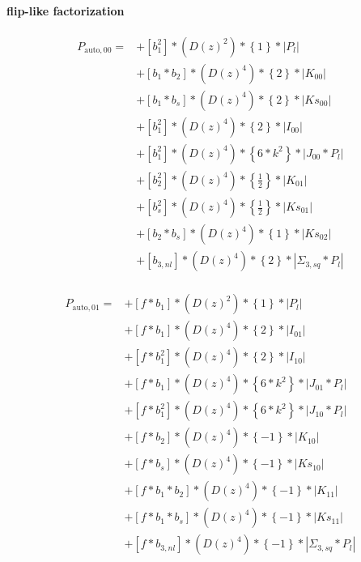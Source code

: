 \documentclass{article}
\begin{document}
\paragraph{flip-like factorization}



\begin{equation}
\begin{aligned}
P_{\mathrm{auto},00}=
&+\left[b_{1}^{2}\right]*\left(D(z)^{2}\right)*\left\{1\right\}*\left|P_l\right| \\
&+\left[b_{1}*b_{2}\right]*\left(D(z)^{4}\right)*\left\{2\right\}*\left|K_{00}\right| \\
&+\left[b_{1}*b_{s}\right]*\left(D(z)^{4}\right)*\left\{2\right\}*\left|Ks_{00}\right| \\
&+\left[b_{1}^{2}\right]*\left(D(z)^{4}\right)*\left\{2\right\}*\left|I_{00}\right| \\
&+\left[b_{1}^{2}\right]*\left(D(z)^{4}\right)*\left\{6*k^{2}\right\}*\left|J_{00}*P_l\right| \\
&+\left[b_{2}^{2}\right]*\left(D(z)^{4}\right)*\left\{\frac{1}{2}\right\}*\left|K_{01}\right| \\
&+\left[b_{s}^{2}\right]*\left(D(z)^{4}\right)*\left\{\frac{1}{2}\right\}*\left|Ks_{01}\right| \\
&+\left[b_{2}*b_{s}\right]*\left(D(z)^{4}\right)*\left\{1\right\}*\left|Ks_{02}\right| \\
&+\left[b_{3,nl}\right]*\left(D(z)^{4}\right)*\left\{2\right\}*\left|\Sigma_{3,sq}*P_l\right| \\
\end{aligned}
\end{equation}


\begin{equation}
\begin{aligned}          
P_{\mathrm{auto},01}=
&+\left[f*b_{1}\right]*\left(D(z)^{2}\right)*\left\{1\right\}*\left|P_l\right| \\
&+\left[f*b_{1}\right]*\left(D(z)^{4}\right)*\left\{2\right\}*\left|I_{01}\right| \\
&+\left[f*b_{1}^{2}\right]*\left(D(z)^{4}\right)*\left\{2\right\}*\left|I_{10}\right| \\
&+\left[f*b_{1}\right]*\left(D(z)^{4}\right)*\left\{6*k^{2}\right\}*\left|J_{01}*P_l\right| \\
&+\left[f*b_{1}^{2}\right]*\left(D(z)^{4}\right)*\left\{6*k^{2}\right\}*\left|J_{10}*P_l\right| \\
&+\left[f*b_{2}\right]*\left(D(z)^{4}\right)*\left\{-1\right\}*\left|K_{10}\right| \\
&+\left[f*b_{s}\right]*\left(D(z)^{4}\right)*\left\{-1\right\}*\left|Ks_{10}\right| \\
&+\left[f*b_{1}*b_{2}\right]*\left(D(z)^{4}\right)*\left\{-1\right\}*\left|K_{11}\right| \\
&+\left[f*b_{1}*b_{s}\right]*\left(D(z)^{4}\right)*\left\{-1\right\}*\left|Ks_{11}\right| \\
&+\left[f*b_{3,nl}\right]*\left(D(z)^{4}\right)*\left\{-1\right\}*\left|\Sigma_{3,sq}*P_l\right| \\
\end{aligned}
\end{equation}
\end{document}

